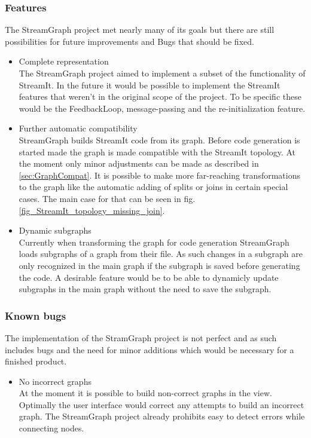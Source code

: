 \documentclass[journal]{IEEEtran}
\begin{document}
\subsubsection{Features}
The StreamGraph project met nearly many of its goals but there are still 
possibilities for future improvements and Bugs that should be fixed.
\begin{itemize}

\item Complete representation\\
The StreamGraph project aimed to implement a subset of the functionality
of StreamIt. In the future it would be possible to implement the StreamIt
features that weren't in the original scope of the project. To be specific these
would be the FeedbackLoop, message-passing and the re-initialization feature.\\

\item Further automatic compatibility\\
\label{feature:automatic_compatability}
StreamGraph builds StreamIt code from its graph. Before code generation is
started made the graph is made compatible with the StreamIt topology. At the
moment only minor adjustments can be made as described in
\ref{sec:GraphCompat}. It is possible to make more far-reaching
transformations to the graph like the automatic adding of splits or joins in
certain special cases. The main case for that can be seen in fig.
\ref{fig_StreamIt_topology_missing_join}.

\item Dynamic subgraphs\\
Currently when transforming the graph for code generation
StreamGraph loads subgraphs of a graph from their file. As such 
changes in a subgraph are only recognized in the main graph if the subgraph
is saved before generating the code. A desirable feature would be to be able
to dynamicly update subgraphs in the main graph without the need to save the
subgraph.
\end{itemize}

\subsubsection{Known bugs}
The implementation of the StramGraph project is not perfect and as such includes
bugs and the need for minor additions which would be necessary for a finished product.
\begin{itemize}

\item No incorrect graphs\\
\label{bug:incorrect_graphs}
At the moment it is possible to build non-correct graphs in the view. Optimally the 
user interface would correct any attempts to build an incorrect graph. The StreamGraph 
project already prohibits easy to detect errors while connecting nodes.

\end{itemize}
\end{document}
